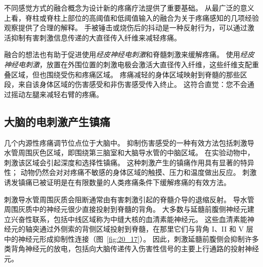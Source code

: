 不同感觉方式的融合概念为设计新的疼痛疗法提供了重要基础。
从最广泛的意义上看，脊柱或脊柱上部位的高阈值和低阈值输入的融合为关于疼痛感知的几项经验观察提供了合理的解释。
手被锤击或烧伤后的抖动是一种反射行为，可以通过激活抑制有害刺激信息传递的大直径传入纤维来减轻疼痛。


融合的想法也有助于促进使用\textit{经皮神经电刺激}和脊髓刺激来缓解疼痛。
使用\textit{经皮神经电刺激}，放置在外围位置的刺激电极会激活大直径传入纤维，这些纤维支配重叠区域，但也围绕受伤和疼痛区域。
疼痛减轻的身体区域映射到脊髓的那些区段，来自该身体区域的伤害感受和非伤害感受传入终止。
这符合直觉：您不会通过摇动左腿来减轻右臂的疼痛。



\subsection{大脑的电刺激产生镇痛}

几个内源性疼痛调节位点位于大脑中。
抑制伤害感受的一种有效方法包括刺激导水管周围灰色区域，即围绕第三脑室和大脑导水管的中脑区域。
在实验动物中，刺激该区域会引起深度和选择性镇痛。
这种刺激产生的镇痛作用具有显著的特异性；
动物仍然会对对疼痛不敏感的身体区域的触摸、压力和温度做出反应。
刺激诱发镇痛已被证明是在有限数量的人类疼痛条件下缓解疼痛的有效方法。


刺激导水管周围灰质会阻断通常由有害刺激引起的脊髓介导的退缩反射。
导水管周围灰质中的神经元很少直接投射到脊髓的背角。 
大多数与延髓前腹侧神经元建立兴奋性联系，包括中线区域称为中缝大核的血清素能神经元。
这些血清素能神经元的轴突通过外侧索的背侧区域投射到脊髓，在那里它们与背角 I、II 和 V 层中的神经元形成抑制性连接（图~\ref{fig:20_17}）。
因此，刺激延髓前腹侧会抑制许多类背角神经元的放电，包括向大脑传递传入伤害性信号的主要上行通路的投射神经元。


